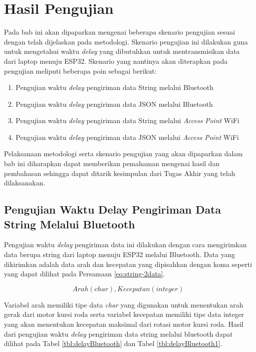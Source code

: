 \section{Hasil Pengujian}
\label{sec:hasil pengujian}

Pada bab ini akan dipaparkan mengenai beberapa skenario pengujian sesuai dengan telah dijelaskan pada metodologi. Skenario pengujian ini dilakukan guna untuk mengetahui waktu \emph{delay} yang dibutuhkan untuk mentransmisikan data dari laptop menuju ESP32. Skenario yang nantinya akan diterapkan pada pengujian meliputi beberapa poin sebagai berikut:

\begin{enumerate}
  \item Pengujian waktu \emph{delay} pengiriman data String melalui Bluetooth
  \item Pengujian waktu \emph{delay} pengiriman data JSON melalui Bluetooth
  \item Pengujian waktu \emph{delay} pengiriman data String melalui \emph{Access Point} WiFi
  \item Pengujian waktu \emph{delay} pengiriman data JSON melalui \emph{Access Point} WiFi
\end{enumerate}

Pelaksanaan metodologi serta skenario pengujian yang akan dipaparkan dalam bab ini diharapkan dapat memberikan pemahaman mengenai hasil dan pembahasan sehingga dapat ditarik kesimpulan dari Tugas Akhir yang telah dilaksanakan.

\subsection{Pengujian Waktu Delay Pengiriman Data String Melalui Bluetooth}

Pengujian waktu \emph{delay} pengiriman data ini dilakukan dengan cara mengirimkan data berupa string dari laptop menuju ESP32 melalui Bluetooth. Data yang dikirimkan adalah data arah dan kecepatan yang dipisahkan dengan koma seperti yang dapat dilihat pada Persamaan \ref{eq:string-2data}.

\begin{equation}
  \label{eq:string-2data}
    Arah(char),Kecepatan(integer)
\end{equation}

Variabel arah memiliki tipe data \emph{char} yang digunakan untuk menentukan arah gerak dari motor kursi roda serta variabel kecepatan memiliki tipe data integer yang akan menentukan kecepatan maksimal dari rotasi motor kursi roda. Hasil dari pengujian waktu \emph{delay} pengiriman data string melalui bluetooth dapat dilihat pada Tabel \ref{tbl:delayBluetooth} dan Tabel \ref{tbl:delayBluetooth1}.

